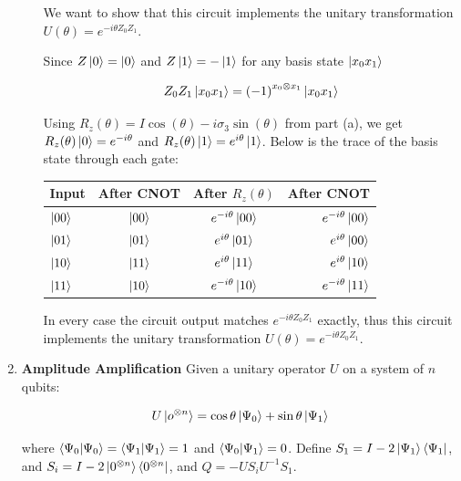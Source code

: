 \documentclass[11pt]{article}
\begin{document}
\begin{enumerate}
\begin{enumerate}
		            We want to show that this circuit implements the unitary transformation $U(\theta) = e^{-i \theta Z_0 Z_1}$.

		            Since $Z\ket{0} = \ket{0}$ and $Z\ket{1} = -\ket{1}$ for any basis state $\ket{x_0 x_1}$

		            \begin{equation*}
			            Z_0 Z_1 \ket{x_0 x_1} = {(-1)}^{x_0 \otimes x_1} \ket{x_0 x_1}
		            \end{equation*}

		            Using $R_z(\theta) = I \cos(\theta) - i \sigma_3 \sin(\theta)$ from part (a), we get $R_z(\theta)\ket{0} = e^{-i \theta}$ and $R_z(\theta)\ket{1} = e^{i\theta}\ket{1}$. Below is the trace of the basis state through each gate:

		            \centering
		            \begin{tabular}{l c c r}
			            Input      & After CNOT & After $R_z(\theta)$     & After CNOT              \\
			            \hline
			            $\ket{00}$ & $\ket{00}$ & $e^{-i \theta}\ket{00}$ & $e^{-i \theta}\ket{00}$ \\
			            $\ket{01}$ & $\ket{01}$ & $e^{i \theta}\ket{01}$  & $e^{i \theta}\ket{00}$  \\
			            $\ket{10}$ & $\ket{11}$ & $e^{i \theta}\ket{11}$  & $e^{i \theta}\ket{10}$  \\
			            $\ket{11}$ & $\ket{10}$ & $e^{-i \theta}\ket{10}$ & $e^{-i \theta}\ket{11}$ \\
		            \end{tabular}

		            \raggedright
		            In every case the circuit output matches $e^{-i \theta Z_0 Z_1}$ exactly, thus this circuit implements the unitary transformation $U(\theta) = e^{-i \theta Z_0 Z_1}$.

	      \end{enumerate}

	\item \textbf{Amplitude Amplification} Given a unitary operator $U$ on a system of $n$ qubits:

	      \begin{align*}
		      U\ket{o^{\otimes n}} = \cos \theta \ket{\Psi_0} + \sin \theta \ket{\Psi_1}
	      \end{align*}

	      where $\braket{\Psi_0 | \Psi_0} = \braket{\Psi_1 | \Psi_1} = 1$ and $\braket{\Psi_0 | \Psi_1} = 0$. Define $S_1 = I - 2 \ket{\Psi_1} \bra{\Psi_1}$, and $S_i = I - 2 \ket{0^{\otimes n}} \bra{0^{\otimes n}}$, and $Q = -US_i U^{-1}S_1$.


\end{enumerate}
\end{document}
